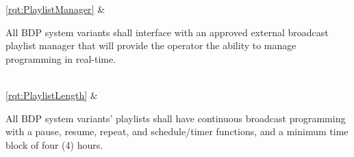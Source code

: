 \ref{rqt:PlaylistManager} & \begin{minipage}{\KsaRightColumnWidth}{\vspace{\KsaVspace}All BDP system variants shall interface with an approved external broadcast playlist manager that will provide the operator the ability to manage programming in real-time.\vspace{\KsaVspace}}\end{minipage}\\ \hline%
\ref{rqt:PlaylistLength} & \begin{minipage}{\KsaRightColumnWidth}{\vspace{\KsaVspace}All BDP system variants' playlists shall have continuous broadcast programming with a pause, resume, repeat, and schedule/timer functions, and a minimum time block of four (4) hours.\vspace{\KsaVspace}}\end{minipage}\\ \hline%
